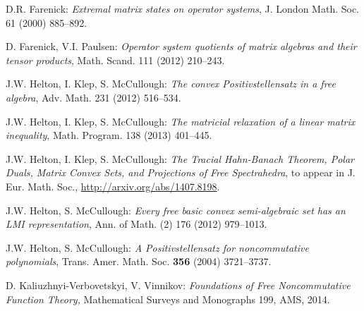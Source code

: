 \documentclass[12pt,makeidx]{amsart}
\numberwithin{equation}{section}
\begin{document}
\begin{thebibliography}{69}
D.R. Farenick: 
{\it Extremal matrix states on operator systems}, J. London Math. Soc. 61 (2000) 885--892.

D.  Farenick, V.I. Paulsen: 
{\it Operator system quotients of matrix algebras and their tensor products}, 
{Math. Scand.} {111} (2012) 210--243.

 J.W. Helton, I. Klep, S. McCullough:
{\it The convex Positivstellensatz in a free algebra},
Adv. Math. {231} (2012) 516--534.

 J.W. Helton, I. Klep, S. McCullough:
{\it The matricial relaxation of a linear matrix inequality},
Math. Program. {138} (2013) 401--445.

 
 J.W. Helton, I. Klep, S. McCullough:
{\it  The Tracial Hahn-Banach Theorem, Polar Duals, Matrix Convex Sets, and Projections of Free Spectrahedra},
to appear in J. Eur. Math. Soc.,
\url{http://arxiv.org/abs/1407.8198}.



 J.W. Helton, S. McCullough:
{\it Every free basic convex semi-algebraic set has an LMI representation},
{Ann. of Math. (2)} {176} (2012) 979--1013.

 J.W. Helton, S. McCullough: 
{\it A Positivstellensatz for noncommutative polynomials},
Trans. Amer. Math. Soc. {\bf 356} (2004) 3721--3737.


D. Kaliuzhnyi-Verbovetskyi, V. Vinnikov:
{\it Foundations of Free Noncommutative Function Theory,}
Mathematical Surveys and Monographs {199}, AMS, 
2014.


\end{thebibliography}
\end{document}
